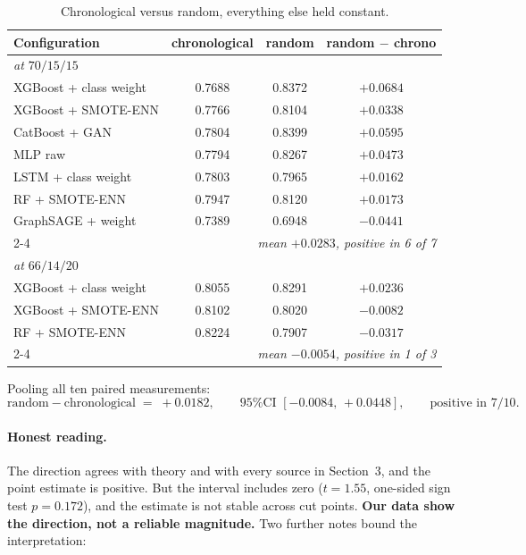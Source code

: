 \documentclass[11pt,a4paper]{article}
\newcommand{\hi}[1]{\textbf{\textcolor{accent}{#1}}}
\begin{document}
\begin{table}[h]
      \centering\small
      \caption{Chronological versus random, everything else held constant.}
      \label{tab:controlled}
      \begin{tabularx}{\textwidth}{Xccc}
            \toprule
            Configuration & chronological & random & random $-$ chrono\\
            \midrule
            \multicolumn{4}{l}{\emph{at $70/15/15$}}\\
            XGBoost + class weight & 0.7688 & 0.8372 & $+0.0684$\\
            XGBoost + SMOTE-ENN & 0.7766 & 0.8104 & $+0.0338$\\
            CatBoost + GAN & 0.7804 & 0.8399 & $+0.0595$\\
            MLP raw & 0.7794 & 0.8267 & $+0.0473$\\
            LSTM + class weight & 0.7803 & 0.7965 & $+0.0162$\\
            RF + SMOTE-ENN & 0.7947 & 0.8120 & $+0.0173$\\
            GraphSAGE + weight & 0.7389 & 0.6948 & $-0.0441$\\
            \cmidrule(l){2-4}
            & \multicolumn{3}{r}{\emph{mean $+0.0283$, positive in 6 of 7}}\\
            \midrule
            \multicolumn{4}{l}{\emph{at $66/14/20$}}\\
            XGBoost + class weight & 0.8055 & 0.8291 & $+0.0236$\\
            XGBoost + SMOTE-ENN & 0.8102 & 0.8020 & $-0.0082$\\
            RF + SMOTE-ENN & 0.8224 & 0.7907 & $-0.0317$\\
            \cmidrule(l){2-4}
            & \multicolumn{3}{r}{\emph{mean $-0.0054$, positive in 1 of 3}}\\
            \bottomrule
      \end{tabularx}
\end{table}

Pooling all ten paired measurements:
\[
  \text{random} - \text{chronological} \;=\; +0.0182,\qquad
  \text{95\% CI } [-0.0084,\, +0.0448],\qquad
  \text{positive in } 7/10 .
\]

\paragraph{Honest reading.} The direction agrees with theory and with every source in Section~3,
and the point estimate is positive. But the interval includes zero ($t = 1.55$, one-sided sign
test $p = 0.172$), and the estimate is not stable across cut points. \hi{Our data show the
direction, not a reliable magnitude.} Two further notes bound the interpretation:
\end{document}
